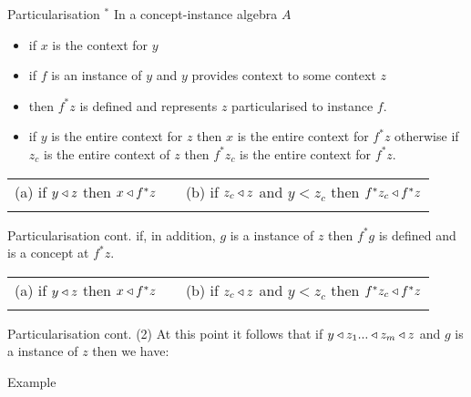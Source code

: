 \begin{frame}{Particularisation $^*$}
In a concept-instance algebra $A$

\begin{itemize}
\item if $x$ is the context for $y$
\item if $f$ is an instance of $y$ and $y$ provides context to some context $z$
\item then  $f^*z$  is defined and represents $z$ particularised to instance $f$.
\item if $y$ is the entire context for $z$ then $x$ is the entire context for $f^*z$
otherwise if $z_c$ is the entire context of $z$ then $f^*z_c$ is the entire context for $f^*z$.
\end{itemize}
\medskip
\pause
\begin{tabular} {c p{0.2cm} c}
(a) if $y \triangleleft z$ then $x \triangleleft f^*z$   &&   (b) if $z_c \triangleleft z$ and $y <z_c$ then $f^*z_c \triangleleft f^*z$ \\[0.5cm]
&& \\
\end{tabular}
\end{frame}

\begin{frame}{Particularisation cont.}
if, in addition, $g$ is a instance of $z$ then $f^*g$ is defined and is a concept at $f^*z$. \\

\medskip
\pause
\begin{tabular} {c p{0.2cm} c}
(a) if $y \triangleleft z$ then $x \triangleleft f^*z$   &&   (b) if $z_c \triangleleft z$ and $y <z_c$ then $f^*z_c \triangleleft f^*z$ \\[0.5cm]
&& \\
\end{tabular}
\end{frame}

\begin{frame}{Particularisation cont. (2)}
At this point it follows that if $y \triangleleft z_1 ... \triangleleft z_m \triangleleft z$ and $g$ is a instance of $z$ then we have:
 
\end{frame}

\begin{frame}{Example}

\end{frame}







